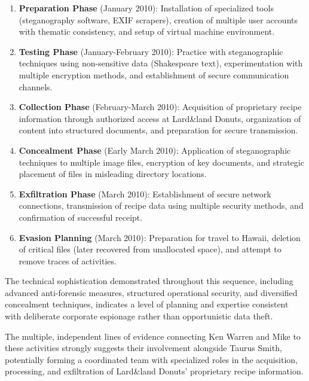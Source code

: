 \begin{enumerate}
    \item \textbf{Preparation Phase} (January 2010): Installation of specialized tools (steganography software, EXIF scrapers), creation of multiple user accounts with thematic consistency, and setup of virtual machine environment.
    
    \item \textbf{Testing Phase} (January-February 2010): Practice with steganographic techniques using non-sensitive data (Shakespeare text), experimentation with multiple encryption methods, and establishment of secure communication channels.
    
    \item \textbf{Collection Phase} (February-March 2010): Acquisition of proprietary recipe information through authorized access at Lard\&land Donuts, organization of content into structured documents, and preparation for secure transmission.
    
    \item \textbf{Concealment Phase} (Early March 2010): Application of steganographic techniques to multiple image files, encryption of key documents, and strategic placement of files in misleading directory locations.
    
    \item \textbf{Exfiltration Phase} (March 2010): Establishment of secure network connections, transmission of recipe data using multiple security methods, and confirmation of successful receipt.
    
    \item \textbf{Evasion Planning} (March 2010): Preparation for travel to Hawaii, deletion of critical files (later recovered from unallocated space), and attempt to remove traces of activities.
\end{enumerate}

The technical sophistication demonstrated throughout this sequence, including advanced anti-forensic measures, structured operational security, and diversified concealment techniques, indicates a level of planning and expertise consistent with deliberate corporate espionage rather than opportunistic data theft.

The multiple, independent lines of evidence connecting Ken Warren and Mike to these activities strongly suggests their involvement alongside Taurus Smith, potentially forming a coordinated team with specialized roles in the acquisition, processing, and exfiltration of Lard\&land Donuts' proprietary recipe information.